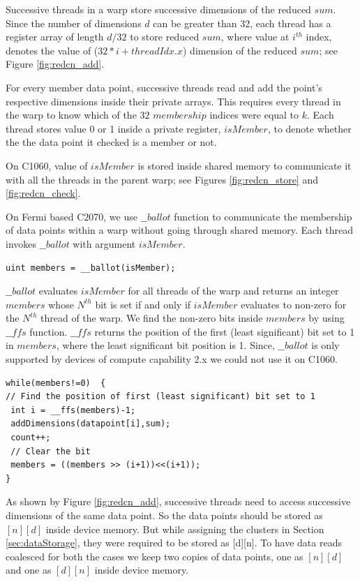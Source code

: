 Successive threads in a warp store successive dimensions of the reduced $sum$. Since the number of dimensions $d$ can be greater than 32, each thread has a register array of length $d/32$ to store reduced $sum$, where value at $i^{th}$ index, denotes the value of ($32*i+threadIdx.x$) dimension of the reduced $sum$; see Figure \ref{fig:redcn_add}. 

For every member data point, successive threads read and add the point's respective dimensions inside their private arrays.
This requires every thread in the warp to know which of the $32$ $membership$ indices were equal to $k$. Each thread stores value 0 or 1 inside a private register, $isMember$, to denote whether the the data point it checked is a member or not.
 
On C1060, value of $isMember$ is stored inside shared memory to communicate it with all the threads in the parent warp; see Figures \ref{fig:redcn_store} and \ref{fig:redcn_check}.
 
On Fermi based C2070, we use $\_\_ballot$ function to communicate the membership of data points within a warp without going through shared memory. Each thread invokes $\_\_ballot$ with argument $isMember$.
\begin{lstlisting}[morekeywords={__ffs}]
uint members = __ballot(isMember);
\end{lstlisting}

$\_\_ballot$ evaluates $isMember$ for all threads of the warp and returns an integer $members$ whose $N^{th}$ bit is set if and only if $isMember$ evaluates to non-zero for the $N^{th}$ thread of the warp. We find the non-zero bits inside $members$ by using $\_\_ffs$ function. $\_\_ffs$ returns the position of the first (least significant) bit set to 1 in $members$, where the least significant bit position is 1. Since, $\_\_ballot$ is only supported by devices of compute capability 2.x we could not use it on C1060.
\begin{lstlisting}[morekeywords={__ffs}]
while(members!=0)  {
// Find the position of first (least significant) bit set to 1
 int i = __ffs(members)-1;
 addDimensions(datapoint[i],sum);
 count++;
 // Clear the bit
 members = ((members >> (i+1))<<(i+1));
}
\end{lstlisting}
    
As shown by Figure \ref{fig:redcn_add}, successive threads need to access successive dimensions of the same data point. So the data points should be stored as $[n][d]$ inside device memory. But while assigning the clusters in Section \ref{sec:dataStorage}, they were required to be stored as [d][n]. To have data reads coalesced for both the cases we keep two copies of data points, one as $[n][d]$ and one as $[d][n]$ inside device memory.

